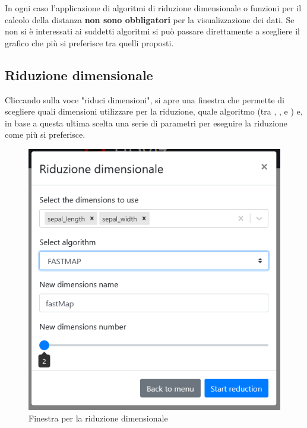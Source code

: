 In ogni caso l'applicazione di algoritmi di riduzione dimensionale o funzioni per il calcolo della distanza \textbf{non sono obbligatori} per la visualizzazione dei dati. Se non si è interessati ai suddetti algoritmi si può passare direttamente a scegliere il grafico che più si preferisce tra quelli proposti.
\newpage
\subsection{Riduzione dimensionale} 
Cliccando sulla voce "riduci dimensioni", si apre una finestra che permette di scegliere quali dimensioni utilizzare per la riduzione, quale algoritmo (tra , ,  e ) e, in base a questa ultima scelta una serie di parametri per eseguire la riduzione come più si preferisce.
\begin{figure}[H]
		\includegraphics[scale=0.5]{Images/RiduzioneDimensionale.png}
		\centering
		\caption{Finestra per la riduzione dimensionale}
\end{figure}
\newpage
